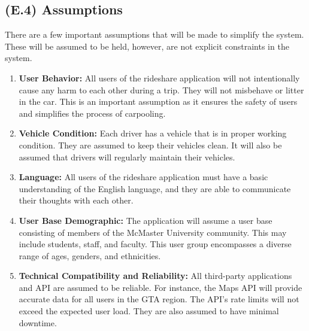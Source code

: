 \documentclass[12pt,letterpaper]{article}
\begin{document}
\subsection{(E.4) Assumptions}
There are a few important assumptions that will be made to simplify the system. These will be assumed to be held, however, are not explicit constraints in the system.  
\begin{enumerate}
\item \textbf{User Behavior:} All users of the rideshare application will not intentionally cause any harm to each other during a trip. They will not misbehave or litter in the car. This is an important assumption as it ensures the safety of users and simplifies the process of carpooling.  
\item \textbf{Vehicle Condition:} Each driver has a vehicle that is in proper working condition. They are assumed to keep their vehicles clean. It will also be assumed that drivers will regularly maintain their vehicles.
\item \textbf{Language:} All users of the rideshare application must have a basic understanding of the English language, and they are able to communicate their thoughts with each other.
\item \textbf{User Base Demographic:} The application will assume a user base consisting of members of the McMaster University community. This may include students, staff, and faculty. This user group encompasses a diverse range of ages, genders, and ethnicities.
\item \textbf{Technical Compatibility and Reliability:} All third-party applications and API are assumed to be reliable. For instance, the Maps API will provide accurate data for all users in the GTA region. The API's rate limits will not exceed the expected user load. They are also assumed to have minimal downtime. 
\end{enumerate}
\end{document}
